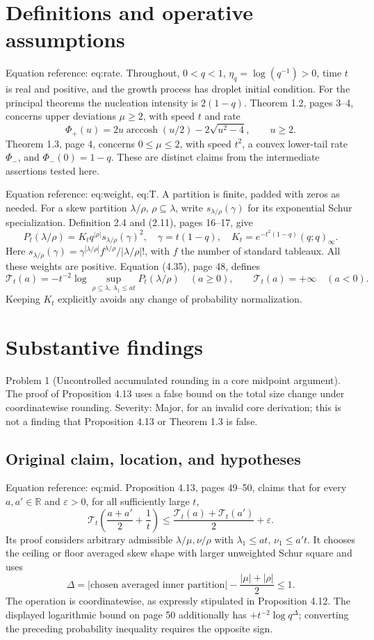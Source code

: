 \documentclass[10pt]{article}
\begin{document}
\section*{Definitions and operative assumptions}
Equation reference: eq:rate. Throughout, \(0<q<1\), \(\eta_q=\log(q^{-1})>0\), time \(t\) is real and positive, and the growth process has droplet initial condition. For the principal theorems the nucleation intensity is \(2(1-q)\). Theorem 1.2, pages 3–4, concerns upper deviations \(\mu\ge2\), with speed \(t\) and rate \[
 \Phi_+(u)=2u\mathop{\mathrm{arccosh}}(u/2)-2\sqrt{u^2-4},\qquad u\ge2.\] Theorem 1.3, page 4, concerns \(0\le\mu\le2\), with speed \(t^2\), a convex lower-tail rate \(\Phi_-\), and \(\Phi_-(0)=1-q\). These are distinct claims from the intermediate assertions tested here.\par
Equation reference: eq:weight, eq:T. A partition is finite, padded with zeros as needed. For a skew partition \(\lambda/\rho\), \(\rho\subseteq\lambda\), write \(s_{\lambda/\rho}(\gamma)\) for its exponential Schur specialization. Definition 2.4 and (2.11), pages 16–17, give \[
 P_t(\lambda/\rho)=K_t q^{|\rho|}s_{\lambda/\rho}(\gamma)^2,\quad
 \gamma=t(1-q),\quad K_t=e^{-t^2(1-q)}(q;q)_\infty.\] Here \(s_{\lambda/\rho}(\gamma)=\gamma^{|\lambda/\rho|}f^{\lambda/\rho}/|\lambda/\rho|!\), with \(f\) the number of standard tableaux. All these weights are positive. Equation (4.35), page 48, defines \[
 \mathcal T_t(a)=-t^{-2}\log\sup_{\rho\subseteq\lambda,\ \lambda_1\le at}P_t(\lambda/\rho)
 \quad(a\ge0),\qquad \mathcal T_t(a)=+\infty\quad(a<0).\] Keeping \(K_t\) explicitly avoids any change of probability normalization.\par
\section*{Substantive findings}
Problem 1 (Uncontrolled accumulated rounding in a core midpoint argument).  The proof of Proposition 4.13 uses a false bound on the total size change under coordinatewise rounding. Severity: Major, for an invalid core derivation; this is not a finding that Proposition 4.13 or Theorem 1.3 is false.\par
\subsection*{Original claim, location, and hypotheses}
Equation reference: eq:mid. Proposition 4.13, pages 49–50, claims that for every \(a,a'\in\mathbb R\) and \(\varepsilon>0\), for all sufficiently large \(t\), \[
 \mathcal T_t\left(\frac{a+a'}2+\frac1t\right)
 \le\frac{\mathcal T_t(a)+\mathcal T_t(a')}2+\varepsilon.\] Its proof considers arbitrary admissible \(\lambda/\mu,\nu/\rho\) with \(\lambda_1\le at\), \(\nu_1\le a't\). It chooses the ceiling or floor averaged skew shape with larger unweighted Schur square and uses \[\Delta=|\text{chosen averaged inner partition}|-\frac{|\mu|+|\rho|}{2}\le1.\] The operation is coordinatewise, as expressly stipulated in Proposition 4.12. The displayed logarithmic bound on page 50 additionally has \(+t^{-2}\log q^\Delta\); converting the preceding probability inequality requires the opposite sign.\par
\end{document}
